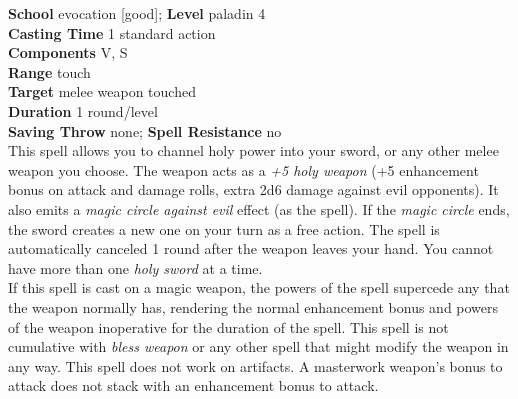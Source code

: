 \textbf{School} evocation [good]; \textbf{Level} paladin 4\\
\textbf{Casting Time} 1 standard action\\
\textbf{Components} V, S\\
\textbf{Range} touch\\
\textbf{Target }melee weapon touched\\
\textbf{Duration} 1 round/level\\
\textbf{Saving Throw} none; \textbf{Spell Resistance} no\\
This spell allows you to channel holy power into your sword, or any other melee weapon you choose. The weapon acts as a \textit{+5 holy weapon }(+5 enhancement bonus on attack and damage rolls, extra 2d6 damage against evil opponents). It also emits a \textit{magic circle against evil }effect (as the spell). If the \textit{magic circle }ends, the sword creates a new one on your turn as a free action. The spell is automatically canceled 1 round after the weapon leaves your hand. You cannot have more than one \textit{holy sword }at a time.\\
If this spell is cast on a magic weapon, the powers of the spell supercede any that the weapon normally has, rendering the normal enhancement bonus and powers of the weapon inoperative for the duration of the spell. This spell is not cumulative with \textit{bless weapon }or any other spell that might modify the weapon in any way. This spell does not work on artifacts. A masterwork weapon's bonus to attack does not stack with an enhancement bonus to attack.\\
